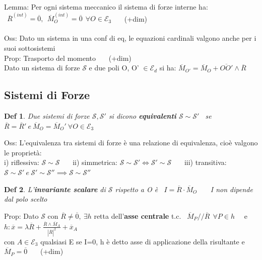 \documentclass{article}
\theoremstyle{unnumbered}
\newtheorem* {theoremT}{Def}
\theoremstyle{unnumbered1}
\newenvironment{defi}{\begin{gBox}\begin{theoremT}}{\end{theoremT}\end{gBox}}
\begin{document}
%
Lemma: Per ogni sistema meccanico il sistema di forze interne ha: $\ \ \overline{R}^{(int)}=\overline{0}, \ \ \overline{M}_O^{(int)}=\overline{0} \ \ \forall O \in \mathcal{E}_3$ \ \ \ (+dim)\\ \\
%
%
%
Oss: Dato un sistema in una conf di eq, le equazioni cardinali valgono anche per i suoi sottosistemi\\
%
Prop: Trasporto del momento \ \ \ (+dim)\\
\phantom{Prop: }Dato un sistema di forze $\mathcal{S}$ e due poli O, O' $\in \mathcal{E}_d$ si ha: $\overline{M}_{O'}=\overline{M}_O + \overline{OO'}\wedge\overline{R}$





\subsection{Sistemi di Forze}
%
\begin{defi}
Due sistemi di forze $\mathcal{S}, \mathcal{S}'$ si dicono \textbf{equivalenti} $\mathcal{S} \sim \mathcal{S}'$ \ se $\overline{R}=\overline{R}' \ e \ \overline{M}_O=\overline{M}_O' \ \forall O \in \mathcal{E}_3$
\end{defi}
%
%
Oss: L'equivalenza tra sistemi di forze è una relazione di equivalenza, cioè valgono le proprietà:\\
\phantom{Oss: }i) riflessiva: $\mathcal{S} \sim \mathcal{S}$ \ \ \ ii) simmetrica: $\mathcal{S} \sim \mathcal{S}' \Leftrightarrow \mathcal{S}' \sim \mathcal{S}$ \ \ \ iii) transitiva: $\mathcal{S} \sim \mathcal{S}' \ e \ \mathcal{S}' \sim \mathcal{S}'' \implies \mathcal{S} \sim \mathcal{S}''$ \\
%
%
%
\begin{defi}
L'\textbf{invariante scalare} di $\mathcal{S}$ rispetto a O è \ $I=\overline{R}\cdot\overline{M}_O$ \ \ \ I non dipende dal polo scelto
\end{defi}
%
%
Prop: Dato $\mathcal{S}$ con $\overline{R}\neq \overline{0}, \ \exists h$ retta dell'\textbf{asse centrale} t.c. \ $\overline{M}_P /\!\!/ \overline{R} \ \ \forall P\in h$ \ \ e $h: \overline{x}=\lambda\overline{R}+\frac{\overline{R}\wedge\overline{M}_A}{|\overline{R}|^2} + \overline{x}_A$\\
\phantom{Prop: }con $A\in \mathcal{E}_3$ qualsiasi \phantom{\ \ \ } E se I=0, h è detto asse di applicazione della risultante e $\overline{M}_P=\overline{0}$ \ \ \ (+dim)\\ \\
\end{document}
